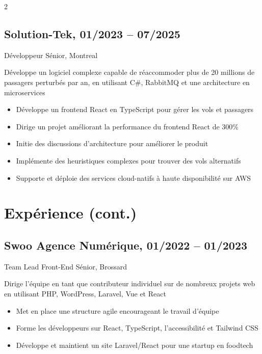 \documentclass{article}
\begin{document}
\begin{paracol}{2}
\begin{rightcolumn}
    \subsection{Solution-Tek, 01/2023 -- 07/2025}
    {Développeur Sénior, Montreal\par}
    {
      Développe un logiciel complexe capable de réaccommoder plus de 20 millions de passagers perturbés par an, en utilisant C\#, RabbitMQ et une architecture en microservices
    \par}
    \begin{itemize}
      \item Développe un frontend React en TypeScript pour gérer les vols et passagers
      \item Dirige un projet améliorant la performance du frontend React de 300\%
      \item Initie des discussions d’architecture pour améliorer le produit
      \item Implémente des heuristiques complexes pour trouver des vols alternatifs
      \item Supporte et déploie des services cloud-natifs à haute disponibilité sur AWS
    \end{itemize}

    \pagebreak
    \section{Expérience (cont.)}

    \subsection{Swoo Agence Numérique, 01/2022 -- 01/2023}
    {Team Lead Front-End Sénior, Brossard\par}
    {
      Dirige l’équipe en tant que contributeur individuel sur de nombreux projets web en utilisant PHP, WordPress, Laravel, Vue et React
    \par}
    \begin{itemize}
      \item Met en place une structure agile encourageant le travail d’équipe
      \item Forme les développeurs sur React, TypeScript, l’accessibilité et Tailwind CSS
      \item Développe et maintient un site Laravel/React pour une startup en foodtech
    \end{itemize}


\end{rightcolumn}
\end{paracol}
\end{document}
